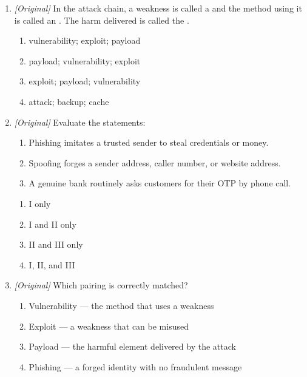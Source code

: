 \begin{enumerate}[label=\textbf{Q\arabic*.}, leftmargin=*]
\begin{enumerate}[label=\Alph*.]
  \end{enumerate}
\item \textit{[Original]} In the attack chain, a weakness is called a
  \underline{\hspace{2.2cm}} and the method using it is called an
  \underline{\hspace{2.2cm}}. The harm delivered is called the
  \underline{\hspace{2.2cm}}.
  \begin{enumerate}[label=\Alph*.]
    \item vulnerability; exploit; payload
    \item payload; vulnerability; exploit
    \item exploit; payload; vulnerability
    \item attack; backup; cache
  \end{enumerate}
\item \textit{[Original]} Evaluate the statements:
  \begin{enumerate}[label=\Roman*.]
    \item Phishing imitates a trusted sender to steal credentials or money.
    \item Spoofing forges a sender address, caller number, or website address.
    \item A genuine bank routinely asks customers for their OTP by phone call.
  \end{enumerate}
  \begin{enumerate}[label=\Alph*.]
    \item I only
    \item I and II only
    \item II and III only
    \item I, II, and III
  \end{enumerate}
\item \textit{[Original]} Which pairing is correctly matched?
  \begin{enumerate}[label=\Alph*.]
    \item Vulnerability --- the method that uses a weakness
    \item Exploit --- a weakness that can be misused
    \item Payload --- the harmful element delivered by the attack
    \item Phishing --- a forged identity with no fraudulent message
  \end{enumerate}


\end{enumerate}
